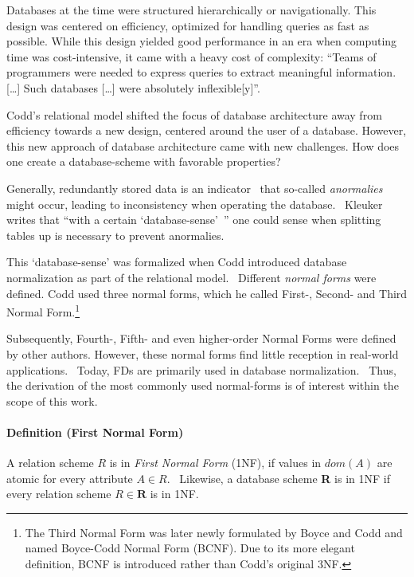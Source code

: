 Databases at the time were structured hierarchically or navigationally.
This design was centered on efficiency, optimized for handling queries as fast as possible.
While this design yielded good performance in an era when computing time was cost-intensive, it came with a heavy cost of complexity:
``Teams of programmers were needed to express queries to extract meaningful information. [\dots] Such databases [\dots] were absolutely inflexible[y]''.~\cite{IBM03}

Codd's relational model shifted the focus of database architecture away from efficiency towards a new design, centered around the user of a database.
However, this new approach of database architecture came with new challenges.
How does one create a database-scheme with favorable properties?

Generally, redundantly stored data is an indicator~\cite[p.~61]{WAT14} that so-called \emph{anormalies} might occur, leading to inconsistency when operating the database.~\cite[p.~162]{STU16}
Kleuker writes that ``with a certain `database-sense'\ '' one could sense when splitting tables up is necessary to prevent anormalies.~\cite[p.~76]{KLE11}

This `database-sense' was formalized when Codd introduced database normalization as part of the relational model.~\cite[p.~381]{COD70}
Different \emph{normal forms} were defined.
Codd used three normal forms, which he called First-, Second- and Third Normal Form.\footnote{The Third Normal Form was later newly formulated by Boyce and Codd and named Boyce-Codd Normal Form (BCNF). Due to its more elegant definition, BCNF is introduced rather than Codd's original 3NF.}

Subsequently, Fourth-, Fifth- and even higher-order Normal Forms were defined by other authors.
However, these normal forms find little reception in real-world applications.~\cite[p.~58]{SCH17}
Today, FDs are primarily used in database normalization.~\cite[p.~1]{CAR16}
Thus, the derivation of the most commonly used normal-forms is of interest within the scope of this work.

\paragraph{Definition (First Normal Form)} A relation scheme $R$ is in \emph{First Normal Form} (1NF), if values in \(dom(A)\) are atomic for every attribute \(A \in R\).~\cite[p.~96]{MAI83}
Likewise, a database scheme \textbf{R} is in 1NF if every relation scheme \(R \in \textbf{R} \) is in 1NF.\

